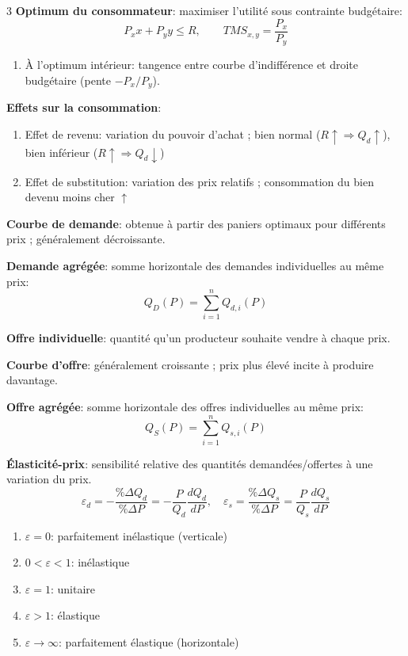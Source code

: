 \documentclass[12pt, a4paper]{article}
\begin{document}
\begin{multicols*}{3}
\textbf{Optimum du consommateur}: maximiser l'utilité sous contrainte budgétaire:
\[
P_xx+P_yy\leq R,\qquad
\boxed{TMS_{x,y}=\frac{P_x}{P_y}}
\]
\begin{enumerate}[\roman*.]
  \item À l'optimum intérieur: tangence entre courbe d'indifférence et droite budgétaire (pente $-P_x/P_y$).
\end{enumerate}

\textbf{Effets sur la consommation}:
\begin{enumerate}[\roman*.]
  \item Effet de revenu: variation du pouvoir d'achat ; bien normal ($R\uparrow\Rightarrow Q_d\uparrow$), bien inférieur ($R\uparrow\Rightarrow Q_d\downarrow$)
  \item Effet de substitution: variation des prix relatifs ; consommation du bien devenu moins cher $\uparrow$
\end{enumerate}

\textbf{Courbe de demande}: obtenue à partir des paniers optimaux pour différents prix ; généralement décroissante.

\textbf{Demande agrégée}: somme horizontale des demandes individuelles au même prix:
\[
Q_D(P)=\sum_{i=1}^{n}Q_{d,i}(P)
\]

\colbreak

\textbf{Offre individuelle}: quantité qu'un producteur souhaite vendre à chaque prix. 

\textbf{Courbe d'offre}: généralement croissante ; prix plus élevé incite à produire davantage.

\textbf{Offre agrégée}: somme horizontale des offres individuelles au même prix:
\[
Q_S(P)=\sum_{i=1}^{n}Q_{s,i}(P)
\]

\textbf{Élasticité-prix}: sensibilité relative des quantités demandées/offertes à une variation du prix.
\[
\boxed{\varepsilon_d=-\frac{\%\Delta Q_d}{\%\Delta P}
=-\frac{P}{Q_d}\frac{dQ_d}{dP},\quad \varepsilon_s=\frac{\%\Delta Q_s}{\%\Delta P}
=\frac{P}{Q_s}\frac{dQ_s}{dP}}
\]
\begin{enumerate}[\roman*.]
  \item $\varepsilon=0$: parfaitement inélastique (verticale)
  \item $0<\varepsilon<1$: inélastique
  \item $\varepsilon=1$: unitaire
  \item $\varepsilon>1$: élastique
  \item $\varepsilon\to\infty$: parfaitement élastique (horizontale)
\end{enumerate}


\end{multicols*}
\end{document}

